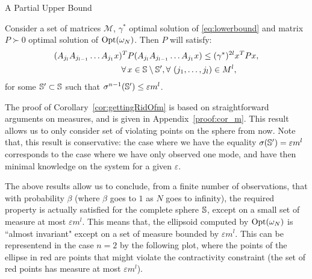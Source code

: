 \begin{subsection}{A Partial Upper Bound}
\begin{cor}\label{cor:gettingRidOfm}
Consider a set of matrices $\mathcal{M}$, $\gamma^{*}$ optimal solution of \eqref{eq:lowerbound} and matrix $P \succ 0$ optimal solution of $\text{Opt}(\omega_N)$. Then $P$ will satisfy:
\begin{equation}\label{eqn:P0}
\begin{aligned}
& (A_{j_l} A_{j_{l-1}} \dots A_{j_1} x)^T P(A_{j_l} A_{j_{l-1}} \dots A_{j_1} x) \leq (\gamma^{*})^{2l} x^T P x, \\
& \qquad \qquad \qquad \qquad \forall\, x \in \mathbb{S} \setminus \mathbb{S}', \forall\ (j_1, \dots, j_l) \in M^l,
\end{aligned}
\end{equation}
for some $\mathbb{S}' \subset \mathbb{S}$ such that $\sigma^{n-1}(\mathbb{S}') \leq \varepsilon m^l $.
\end{cor}

The proof of Corollary~\ref{cor:gettingRidOfm} is based on straightforward arguments on measures, and is given in Appendix~\ref{proof:cor_m}. This result allows us to only consider set of violating points on the sphere from now. Note that, this result is conservative: the case where we have the equality $\sigma(\mathbb{S}') = \varepsilon m^l$ corresponds to the case where we have only observed one mode, and have then minimal knowledge on the system for a given $\varepsilon$.


The above results allow us to conclude, from a finite number of observations, that with probability $\beta$ (where $\beta$ goes to $1$ as $N$ goes to infinity), the required property is actually satisfied for the complete sphere $\mathbb{S}$, except on a small set of measure at most $\varepsilon m^l$. This means that, the ellipsoid computed by $\text{Opt}(\omega_N)$ is ``almost invariant"  except on a set of measure bounded by $\varepsilon m^l$. This can be representend in the case $n=2$ by the following plot, where the points of the ellipse in red are points that might violate the contractivity constraint (the set of red points has measure at most $\varepsilon m^l$).

\begin{figure}[H]\label{fig:ellipsoid}
\begin{center}
\end{center}
\end{figure}
\end{subsection}
